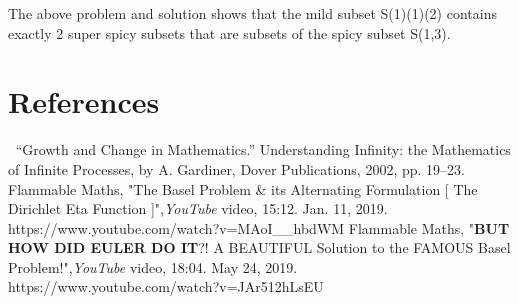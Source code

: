 \documentclass[12pt]{article}
\begin{document}
\newline
The above problem and solution shows that the mild subset S(1)(1)(2) contains exactly 2 super spicy subsets that are subsets of the spicy subset S(1,3).
\newpage
\section{References}
\(\ \)
\newline
“Growth and Change in Mathematics.” Understanding Infinity: the Mathematics of Infinite Processes, by A. Gardiner, Dover Publications, 2002, pp. 19–23.
\newline
\newline
Flammable Maths, "The Basel Problem \& its Alternating Formulation [ The Dirichlet Eta Function ]",\textit{YouTube} video, 15:12. Jan. 11, 2019. \newline
https://www.youtube.com/watch?v=MAoI\_\_hbdWM
\newline
\newline
Flammable Maths, "\textbf{BUT HOW DID EULER DO IT}?! A BEAUTIFUL Solution to the FAMOUS Basel Problem!",\textit{YouTube} video, 18:04. May 24, 2019. https://www.youtube.com/watch?v=JAr512hLsEU
\end{document}
